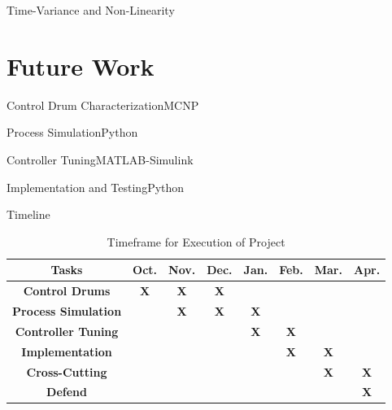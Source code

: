\documentclass[aspectratio=1610,pdftex,dvipsnames]{beamer}
\newcommand{\x}{\cellcolor{lightgray}\textbf{X}} %
\begin{document}
\begin{frame}{Time-Variance and Non-Linearity}
    
\end{frame}

\section{Future Work}

\begin{frame}{Control Drum Characterization}{MCNP}
    
\end{frame}

\begin{frame}{Process Simulation}{Python}
    
\end{frame}

\begin{frame}{Controller Tuning}{MATLAB-Simulink}
    
\end{frame}

\begin{frame}{Implementation and Testing}{Python}
    
\end{frame}

\begin{frame}{Timeline}

    \begin{table}
        \centering
        \caption{Timeframe for Execution of Project}
        \begin{tabular}{c|c|c|c|c|c|c|c}
            \textbf{Tasks} & Oct. & Nov. & Dec. & Jan. & Feb. & Mar. & Apr.\\\hline
            \textbf{Control Drums} & \x & \x & \x &  &  &  & \\\hline
            \textbf{Process Simulation} &  & \x & \x & \x &  &  & \\\hline
            \textbf{Controller Tuning} &  &  &  & \x & \x &  & \\\hline
            \textbf{Implementation} &  &  &  &  & \x & \x & \\\hline
            \textbf{Cross-Cutting} &  &  &  &  &  & \x & \x\\\hline
            \textbf{Defend} &  &  &  &  &  &  & \x \\

        \end{tabular}
    \end{table}
        

\end{frame}
\end{document}
